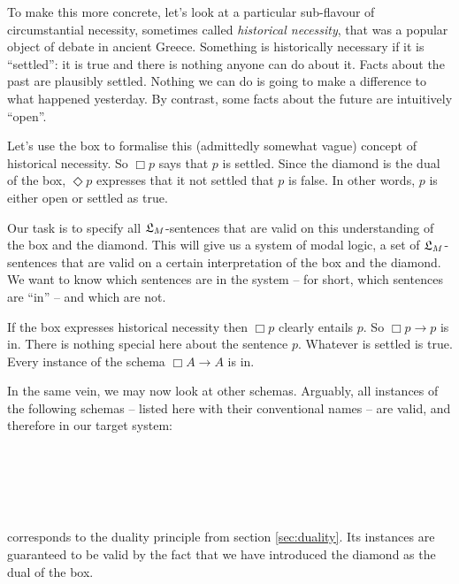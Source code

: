 To make this more concrete, let's look at a particular sub-flavour of
circumstantial necessity, sometimes called \emph{historical necessity}, that was
a popular object of debate in ancient Greece. Something is historically
necessary if it is ``settled'': it is true and there is nothing anyone can do
about it. Facts about the past are plausibly settled. Nothing we can do is going
to make a difference to what happened yesterday. By contrast, some facts about
the future are intuitively ``open''.

Let's use the box to formalise this (admittedly somewhat vague) concept of
historical necessity. So $\Box p$ says that $p$ is settled. Since the diamond is
the dual of the box, $\Diamond p$ expresses that it not settled that $p$ is
false. In other words, $p$ is either open or settled as true.


Our task is to specify all $\mathfrak{L}_{M}$-sentences that are valid on this
understanding of the box and the diamond. This will give us a system of modal
logic, a set of $\mathfrak{L}_{M}$-sentences that are valid on a certain interpretation of
the box and the diamond. We want to know which sentences are in the system --
for short, which sentences are ``in'' -- and which are not.

If the box expresses historical necessity then $\Box p$ clearly entails $p$. So
$\Box p \to p$ is in. There is nothing special here about the sentence $p$.
Whatever is settled is true. Every instance of the schema $\Box A \to A$ is in.

In the same vein, we may now look at other schemas. Arguably, all instances of
the following schemas -- listed here with their conventional names -- are valid,
and therefore in our target system:
%
\begin{principles}
  \\
  \\
  \\
  \\
\end{principles}

 corresponds to the duality principle  from section
\ref{sec:duality}. Its instances are guaranteed to be valid by the fact that we
have introduced the diamond as the dual of the box.

